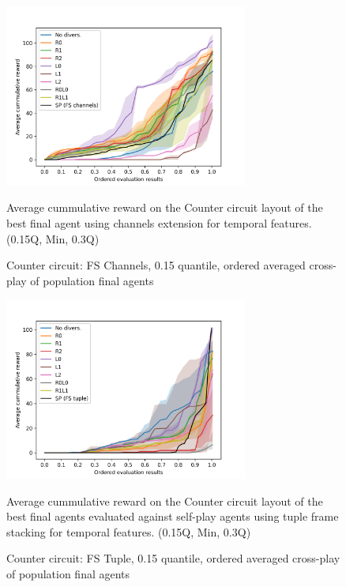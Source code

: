 \begin{figure}[!ht]
    \centering
    \includegraphics*[width=8cm]{../img/CounterCircuitFSChannelsOrderedQ15.png}

    \caption{Counter circuit: FS Channels, 0.15 quantile, ordered averaged cross-play of population final agents}
    \label{CounterCircuitFSChannelsOrderedQ15}
    \medskip
    \small 
    Average cummulative reward on the Counter circuit layout of the best final agent using channels extension for temporal features.    
    (0.15Q, Min, 0.3Q)

\end{figure}

\begin{figure}[!ht]
    \centering
    \includegraphics*[width=8cm]{../img/CounterCircuitFSTupleOrderedQ15.png}

    \caption{Counter circuit: FS Tuple, 0.15 quantile, ordered averaged cross-play of population final agents}
    \label{CounterCircuitFSTupleOrderedQ15}
    \medskip
    \small 
    Average cummulative reward on the Counter circuit layout of the best final agents evaluated against self-play agents using tuple frame stacking for temporal features.
    (0.15Q, Min, 0.3Q)

\end{figure}



